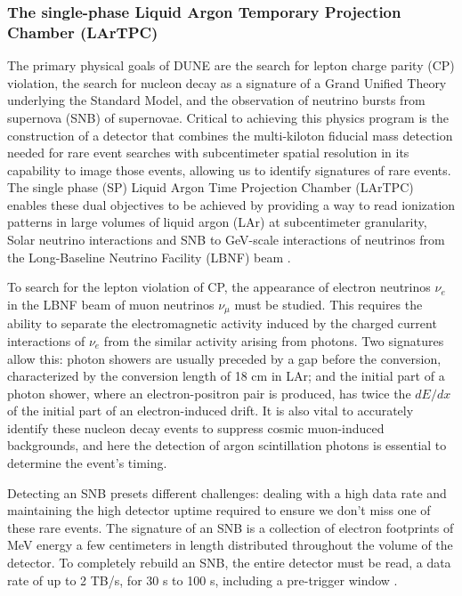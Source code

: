 \documentclass[a4paper,10pt,epsfig,epsf,amsfonts,amsmath]{article}
\begin{document}
\subsubsection{The single-phase Liquid Argon Temporary Projection Chamber (LArTPC)}


The primary physical goals of DUNE are the search for lepton charge parity (CP) violation, the search for nucleon decay as a signature of a Grand Unified Theory underlying the Standard Model, and the observation of neutrino bursts from supernova (SNB) of supernovae. Critical to achieving this physics program is the construction of a detector that combines the multi-kiloton fiducial mass detection needed for rare event searches with subcentimeter spatial resolution in its capability to image those events, allowing us to identify signatures of rare events. The single phase (SP) Liquid Argon Time Projection Chamber (LArTPC) \cite{Rubbia:117852} enables these dual objectives to be achieved by providing a way to read ionization patterns in large volumes of liquid argon (LAr) at subcentimeter granularity, Solar neutrino interactions and SNB to GeV-scale interactions of neutrinos from the Long-Baseline Neutrino Facility (LBNF) beam \cite{Abi_2020_2}.

To search for the lepton violation of CP, the appearance of electron neutrinos $\nu_{e}$ in the LBNF beam of muon neutrinos $\nu_{\mu}$ must be studied. This requires the ability to separate the electromagnetic activity induced by the charged current interactions of $\nu_{e}$ from the similar activity arising from photons. Two signatures allow this: photon showers are usually preceded by a gap before the conversion, characterized by the conversion length of 18 cm in LAr; and the initial part of a photon shower, where an electron-positron pair is produced, has twice the $dE/dx$ of the initial part of an electron-induced drift. It is also vital to accurately identify these nucleon decay events to suppress cosmic muon-induced backgrounds, and here the detection of argon scintillation photons is essential to determine the event's timing.

Detecting an SNB presets different challenges: dealing with a high data rate and maintaining the high detector uptime required to ensure we don't miss one of these rare events. The signature of an SNB is a collection of electron footprints of MeV energy a few centimeters in length distributed throughout the volume of the detector. To completely rebuild an SNB, the entire detector must be read, a data rate of up to 2 TB/s, for 30 s to 100 s, including a pre-trigger window \cite{Abi2017}.
\end{document}
